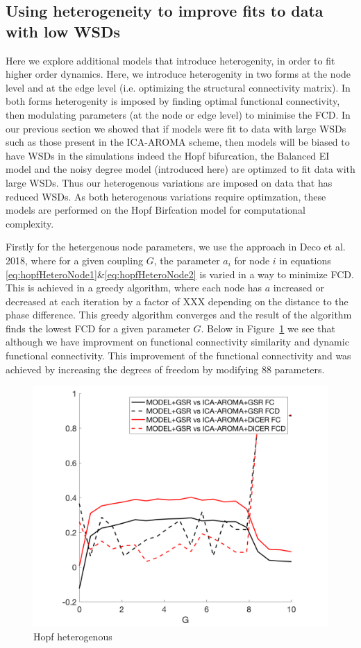 \documentclass[oneside]{zHenriquesLab-StyleBioRxiv}
\begin{document}
\subsection*{Using heterogeneity to improve fits to data with low WSDs}
Here we explore additional models that introduce heterogenity, in order to fit higher order dynamics. Here, we introduce heterogenity in two forms at the node level and at the edge level (i.e. optimizing the structural connectivity matrix). In both forms heterogenity is imposed by finding optimal functional connectivity, then modulating parameters (at the node or edge level) to minimise the FCD. In our previous section we showed that if models were fit to data with large WSDs such as those present in the ICA-AROMA scheme, then models will be biased to have WSDs in the simulations indeed the Hopf bifurcation, the Balanced EI model and the noisy degree model (introduced here) are optimzed to fit data with large WSDs. Thus our heterogenous variations are imposed on data that has reduced WSDs. As both heterogenous variations require optimzation, these models are performed on the Hopf Birfcation model for computational complexity.

Firstly for the hetergenous node parameters, we use the approach in Deco et al. 2018, where for a given coupling $G$, the parameter $a_i$ for node $i$ in equations \ref{eq:hopfHeteroNode1}\&\ref{eq:hopfHeteroNode2} is varied in a way to minimize FCD. This is achieved in a greedy algorithm, where each node has $a$ increased or decreased at each iteration by a factor of XXX depending on the distance to the phase difference. This greedy algorithm converges and the result of the algorithm finds the lowest FCD for a given parameter $G$. Below in Figure~\ref{fig:FCD_all_fits_BTFa} we see that although we have improvment on functional connectivity similarity and dynamic functional connectivity. This improvement of the functional connectivity and was achieved by increasing the degrees of freedom by modifying $88$ parameters. 

\begin{figure}[ht!]
\includegraphics[width=1\columnwidth]{figs/BTF_heterogenous.png}
\caption{Hopf heterogenous}\label{fig:FCD_all_fits_BTFa}
\end{figure}
\end{document}

